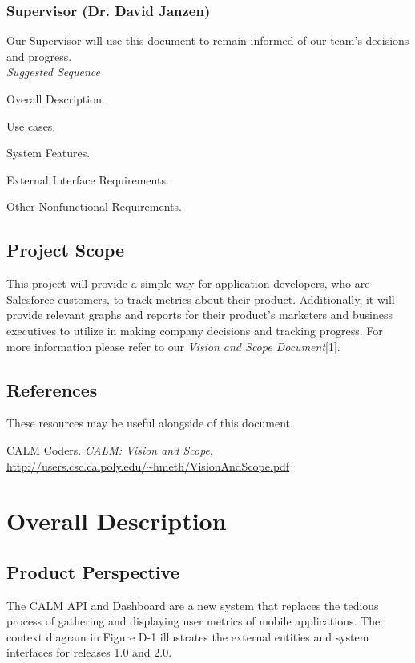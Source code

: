 \documentclass[12pt,oneside,letterpaper]{article}
\newenvironment{packed_enumerate}{ %
\vspace{-7mm}
\begin{enumerate}
  \setlength{\itemsep}{0pt}
  \setlength{\parskip}{0pt}
  \setlength{\parsep}{0pt}
}{\end{enumerate}
\vspace{-8mm}}
\begin{document}
\subsubsection{Supervisor (Dr. David Janzen)}
Our Supervisor will use this document to remain informed of our team's 
decisions and progress. \\
\textit{Suggested Sequence}\\
\begin{packed_enumerate}
\item Overall Description.
\item Use cases.
\item System Features.
\item External Interface Requirements.
\item Other Nonfunctional Requirements.
\end{packed_enumerate}
\subsection{Project Scope}
This project will provide a simple way for application developers, who 
are Salesforce customers, to track metrics about their product. 
Additionally, it will provide relevant graphs and reports for their 
product's marketers and business executives to utilize in making 
company decisions and tracking progress.
For more information please refer to our \textit{Vision and Scope Document}[1].
\subsection{References}
These resources may be useful alongside of this document.\\
\begin{packed_enumerate}
\item CALM Coders. \textit{CALM: Vision and Scope},\\ \url{http://users.csc.calpoly.edu/~hmeth/VisionAndScope.pdf}

\end{packed_enumerate}

\vspace{0.25in}
\section{Overall Description}
\subsection{Product Perspective}
The CALM API and Dashboard are a new system that replaces the tedious 
process of gathering and displaying user metrics of mobile 
applications. The context diagram in Figure D-1 illustrates the 
external entities and system interfaces for releases 1.0 and 2.0.
\end{document}
